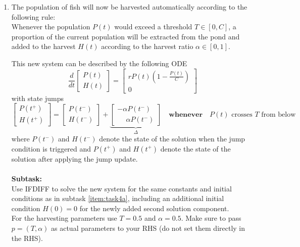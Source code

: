 \begin{enumerate}[label=\alph*)]
    \item\label{item:task4b} The population of fish will now be harvested automatically according to the following rule:\\
    Whenever the population $P(t)$ would exceed a threshold $T \in [0, C]$, a proportion of the current population will be extracted from the pond and added to the harvest $H(t)$ according to the harvest ratio $\alpha \in [0, 1]$.

    This new system can be described by the following ODE
    \begin{equation}\label{eq:fish_harvest}
        \frac{d}{dt}\begin{bmatrix}P(t) \\ H(t)\end{bmatrix} = \begin{bmatrix}rP(t)\left(1 - \frac{P(t)}{C}\right) \\ 0\end{bmatrix}
    \end{equation}
    with state jumps
    \begin{equation}\label{eq:fish_jump}
        \begin{bmatrix}P(t^+) \\ H(t^+)\end{bmatrix} = \begin{bmatrix}P(t^-) \\ H(t^-)\end{bmatrix} +  \underbrace{\begin{bmatrix}-\alpha P(t^-) \\ \phantom{-}\alpha P(t^-)\end{bmatrix}}_{\Delta}\quad\textbf{whenever} \quad\text{$P(t)$ crosses $T$ from below}
    \end{equation}
    where $P(t^-)$ and $H(t^-)$ denote the state of the solution when the jump condition is triggered and $P(t^+)$ and $H(t^+)$ denote the state of the solution after applying the jump update. \\ \\
    \textbf{Subtask:} \\
    Use IFDIFF to solve the new system for the same constants and initial conditions as in subtask \ref{item:task4a}, including an additional initial condition $H(0) = 0$ for the newly added second solution component. \\
    For the harvesting parameters use $T = 0.5$ and $\alpha = 0.5$. Make sure to pass $p = (T, \alpha)$ as actual parameters to your RHS (do not set them directly in the RHS). \\

\end{enumerate}
